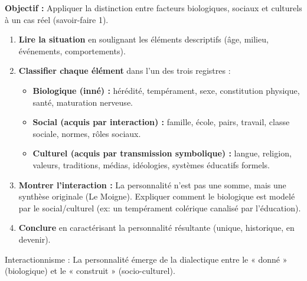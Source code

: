 \documentclass[11pt]{article}
\newcommand{\cle}[1]{{\popxbold\color{popdark}#1}}
\begin{document}
\begin{methode}
\textbf{Objectif :} Appliquer la distinction entre facteurs biologiques, sociaux et culturels à un cas réel (savoir-faire 1).
\begin{enumerate}
    \item \textbf{Lire la situation} en soulignant les éléments descriptifs (âge, milieu, événements, comportements).
    \item \textbf{Classifier chaque élément} dans l'un des trois registres :
    \begin{itemize}
        \item \textbf{Biologique (inné) :} hérédité, tempérament, sexe, constitution physique, santé, maturation nerveuse.
        \item \textbf{Social (acquis par interaction) :} famille, école, pairs, travail, classe sociale, normes, rôles sociaux.
        \item \textbf{Culturel (acquis par transmission symbolique) :} langue, religion, valeurs, traditions, médias, idéologies, systèmes éducatifs formels.
    \end{itemize}
    \item \textbf{Montrer l'interaction :} La personnalité n'est pas une somme, mais une \cle{synthèse originale} (Le Moigne). Expliquer comment le biologique est modelé par le social/culturel (ex: un tempérament colérique canalisé par l'éducation).
    \item \textbf{Conclure} en caractérisant la personnalité résultante (unique, historique, en devenir).
\end{enumerate}
\cle{Interactionnisme} : La personnalité émerge de la dialectique entre le « donné » (biologique) et le « construit » (socio-culturel).
\end{methode}
\end{document}
